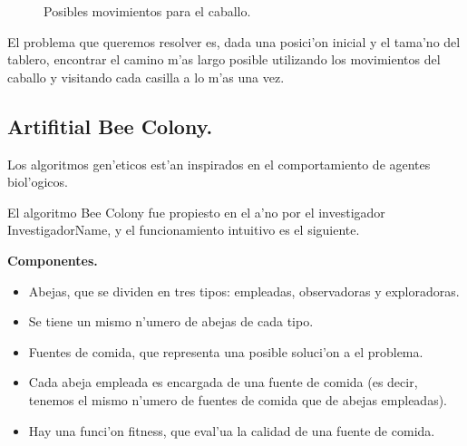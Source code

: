 \documentclass[12pt]{article}
\begin{document}
    \begin{figure}[H]
        \centering
        \caption{Posibles movimientos para el caballo.}
        \label{fig:knight_move}
    \end{figure}



    El problema que queremos resolver es, dada una posici'on inicial y el tama'no del tablero,
    encontrar el camino m'as largo posible utilizando los movimientos del caballo
    y visitando cada casilla a lo m'as una vez.


    \subsection{Artifitial Bee Colony.}
    Los algoritmos gen'eticos est'an inspirados en el comportamiento de
    agentes biol'ogicos.

    El algoritmo Bee Colony fue propiesto en el a'no por el investigador InvestigadorName,
    y el funcionamiento intuitivo es el siguiente.

    \textbf{Componentes.}
    \begin{itemize}
        \setlength\itemsep{0em}
        \item Abejas, que se dividen en tres tipos: empleadas, observadoras y exploradoras.
        \item Se tiene un mismo n'umero de abejas de cada tipo.
        \item Fuentes de comida, que representa una posible soluci'on a el problema.
        \item Cada abeja empleada es encargada de una fuente de comida (es decir, tenemos el mismo n'umero de fuentes
                de comida que de abejas empleadas).
        \item Hay una funci'on fitness, que eval'ua la calidad de una fuente de comida.
    \end{itemize}
\end{document}

